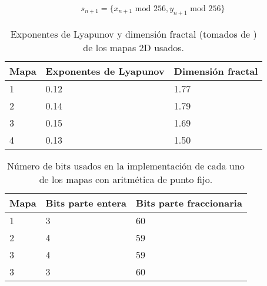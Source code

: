         \begin{equation}
            \begin{array}{lcl}
                s_{n+1} = \{ x_{n+1} \text{ mod } 256, y_{n+1} \text{ mod } 256 \}
            \end{array}
        \end{equation}

        \begin{table}[htbp]
            \centering
            \caption{Exponentes de Lyapunov y dimensión fractal (tomados de \cite{Sprott1993}) de los mapas 2D usados.}
            \begin{tabular}{|l|l|l|}
                \hline
                \rowcolor[rgb]{ .682,  .667,  .667}Mapa  & Exponentes de Lyapunov & Dimensión fractal \\
                \hline
                1     & 0.12                   & 1.77   \\
                \hline
                2     & 0.14                   & 1.79   \\
                \hline
                3     & 0.15                   & 1.69   \\
                \hline
                4     & 0.13                   & 1.50   \\
                \hline
            \end{tabular}
        \end{table}

        \begin{table}[htbp]
            \centering
            \caption{Número de bits usados en la implementación de cada uno de los mapas con aritmética de punto fijo.}
            \begin{tabular}{|l|l|l|}
                \hline
                \rowcolor[rgb]{ .682,  .667,  .667}Mapa  & Bits parte entera & Bits parte fraccionaria \\
                \hline
                1     & 3                   & 60   \\
                \hline
                2     & 4                   & 59   \\
                \hline
                3     & 4                   & 59   \\
                \hline
                3     & 3                   & 60   \\
                \hline
            \end{tabular}
        \end{table}

